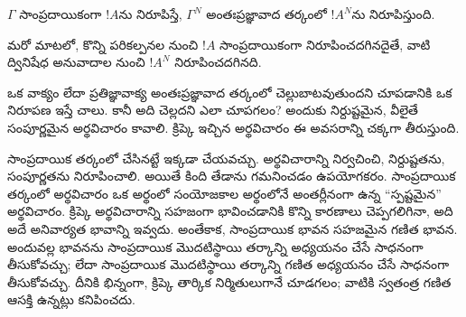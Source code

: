 \documentclass[../../../include/open-logic-section]{subfiles}
\begin{document}
\begin{thm}
$\Gamma$ సాంప్రదాయికంగా $!A$ను నిరూపిస్తే, $\Gamma^N$
అంతఃప్రజ్ఞావాద తర్కంలో $!A^N$ను నిరూపిస్తుంది.
\end{thm}

మరో మాటలో, కొన్ని పరికల్పనల నుంచి $!A$ సాంప్రదాయికంగా
నిరూపించదగినదైతే, వాటి ద్వినిషేధ అనువాదాల నుంచి $!A^N$
నిరూపించదగినది.

ఒక వాక్యం లేదా ప్రతిజ్ఞావాక్య  అంతఃప్రజ్ఞావాద తర్కంలో
చెల్లుబాటవుతుందని చూపడానికి ఒక నిరూపణ ఇస్తే చాలు. కానీ అది చెల్లదని
ఎలా చూపగలం? అందుకు నిర్దుష్టమైన, వీలైతే సంపూర్ణమైన అర్థవిచారం కావాలి.
క్రిప్కె ఇచ్చిన అర్థవిచారం ఈ అవసరాన్ని చక్కగా తీరుస్తుంది.

సాంప్రదాయిక తర్కంలో చేసినట్టే ఇక్కడా చేయవచ్చు. అర్థవిచారాన్ని
నిర్వచించి, నిర్దుష్టతను, సంపూర్ణతను నిరూపించాలి. అయితే కింది తేడాను
గమనించడం ఉపయోగకరం. సాంప్రదాయిక తర్కంలో అర్థవిచారం ఒక అర్థంలో
సంయోజకాల అర్థంలోనే అంతర్లీనంగా ఉన్న ``స్పష్టమైన'' అర్థవిచారం.
క్రిప్కె అర్థవిచారాన్ని సహజంగా భావించడానికి కొన్ని కారణాలు చెప్పగలిగినా, అది
అదే అనివార్యత భావాన్ని ఇవ్వదు. అంతేకాక, సాంప్రదాయిక 
భావన సహజమైన గణిత భావన. అందువల్ల  భావనను సాంప్రదాయిక
మొదటిస్థాయి తర్కాన్ని అధ్యయనం చేసే సాధనంగా తీసుకోవచ్చు; లేదా
సాంప్రదాయిక మొదటిస్థాయి తర్కాన్ని గణిత  అధ్యయనం చేసే
సాధనంగా తీసుకోవచ్చు. దీనికి భిన్నంగా, క్రిప్కె 
తార్కిక నిర్మితులుగానే చూడగలం; వాటికి స్వతంత్ర గణిత ఆసక్తి ఉన్నట్లు
కనిపించదు.
\end{document}
